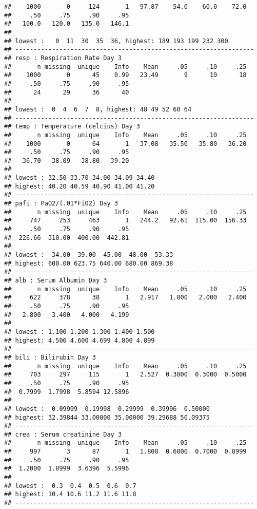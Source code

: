 \documentclass[headinclude=false]{scrartcl}\usepackage[]{graphicx}\usepackage[]{color}
\makeatletter
\newenvironment{kframe}{%
 \def\at@end@of@kframe{}%
 \ifinner\ifhmode%
  \def\at@end@of@kframe{\end{minipage}}%
  \begin{minipage}{\columnwidth}%
 \fi\fi%
 \def\FrameCommand##1{\hskip\@totalleftmargin \hskip-\fboxsep
 \colorbox{shadecolor}{##1}\hskip-\fboxsep
     \hskip-\linewidth \hskip-\@totalleftmargin \hskip\columnwidth}%
 \MakeFramed {\advance\hsize-\width
   \@totalleftmargin\z@ \linewidth\hsize
   \@setminipage}}%
 {\par\unskip\endMakeFramed%
 \at@end@of@kframe}
\newenvironment{knitrout}{}{} %
\makeatother
\begin{document}
\begin{knitrout}
\begin{kframe}
\begin{verbatim}
##    1000       0     124       1   97.87    54.0    60.0    72.0 
##     .50     .75     .90     .95 
##   100.0   120.0   135.0   146.1 
## 
## lowest :   0  11  30  35  36, highest: 189 193 199 232 300 
## -----------------------------------------------------------------
## resp : Respiration Rate Day 3 
##       n missing  unique    Info    Mean     .05     .10     .25 
##    1000       0      45    0.99   23.49       9      10      18 
##     .50     .75     .90     .95 
##      24      29      36      40 
## 
## lowest :  0  4  6  7  8, highest: 48 49 52 60 64 
## -----------------------------------------------------------------
## temp : Temperature (celcius) Day 3 
##       n missing  unique    Info    Mean     .05     .10     .25 
##    1000       0      64       1   37.08   35.50   35.80   36.20 
##     .50     .75     .90     .95 
##   36.70   38.09   38.80   39.20 
## 
## lowest : 32.50 33.70 34.00 34.09 34.40
## highest: 40.20 40.59 40.90 41.00 41.20 
## -----------------------------------------------------------------
## pafi : PaO2/(.01*FiO2) Day 3 
##       n missing  unique    Info    Mean     .05     .10     .25 
##     747     253     463       1   244.2   92.61  115.00  156.33 
##     .50     .75     .90     .95 
##  226.66  310.00  400.00  442.81 
## 
## lowest :  34.00  39.00  45.00  48.00  53.33
## highest: 600.00 623.75 640.00 680.00 869.38 
## -----------------------------------------------------------------
## alb : Serum Albumin Day 3 
##       n missing  unique    Info    Mean     .05     .10     .25 
##     622     378      38       1   2.917   1.800   2.000   2.400 
##     .50     .75     .90     .95 
##   2.800   3.400   4.000   4.199 
## 
## lowest : 1.100 1.200 1.300 1.400 1.500
## highest: 4.500 4.600 4.699 4.800 4.899 
## -----------------------------------------------------------------
## bili : Bilirubin Day 3 
##       n missing  unique    Info    Mean     .05     .10     .25 
##     703     297     115       1   2.527  0.3000  0.3000  0.5000 
##     .50     .75     .90     .95 
##  0.7999  1.7998  5.8594 12.5896 
## 
## lowest :  0.09999  0.19998  0.29999  0.39996  0.50000
## highest: 32.39844 33.00000 35.00000 39.29688 50.09375 
## -----------------------------------------------------------------
## crea : Serum creatinine Day 3 
##       n missing  unique    Info    Mean     .05     .10     .25 
##     997       3      87       1   1.808  0.6000  0.7000  0.8999 
##     .50     .75     .90     .95 
##  1.2000  1.8999  3.6396  5.5996 
## 
## lowest :  0.3  0.4  0.5  0.6  0.7
## highest: 10.4 10.6 11.2 11.6 11.8 
## -----------------------------------------------------------------

\end{verbatim}
\end{kframe}
\end{knitrout}
\end{document}
